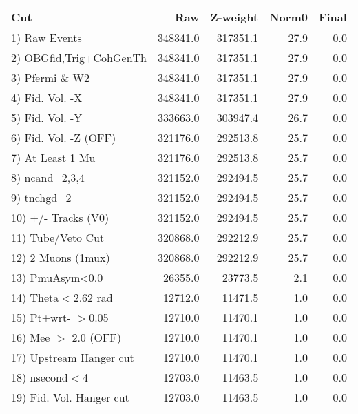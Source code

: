  \begin{table}[h!]\centering
 \begin{tabular}{||l||r|r|r|r||}
 \hline
 \hline
 Cut & Raw & Z-weight & Norm0 & Final \\
 \hline
  1) Raw Events           &    348341.0 &    317351.1 &        27.9 &         0.0 \\
  2) OBGfid,Trig+CohGenTh &    348341.0 &    317351.1 &        27.9 &         0.0 \\
  3) Pfermi \& W2         &    348341.0 &    317351.1 &        27.9 &         0.0 \\
  4) Fid. Vol. -X         &    348341.0 &    317351.1 &        27.9 &         0.0 \\
  5) Fid. Vol. -Y         &    333663.0 &    303947.4 &        26.7 &         0.0 \\
  6) Fid. Vol. -Z (OFF)   &    321176.0 &    292513.8 &        25.7 &         0.0 \\
  7) At Least 1 Mu        &    321176.0 &    292513.8 &        25.7 &         0.0 \\
  8) ncand=2,3,4          &    321152.0 &    292494.5 &        25.7 &         0.0 \\
  9) tnchgd=2             &    321152.0 &    292494.5 &        25.7 &         0.0 \\
 10) +/- Tracks (V0)      &    321152.0 &    292494.5 &        25.7 &         0.0 \\
 11) Tube/Veto Cut        &    320868.0 &    292212.9 &        25.7 &         0.0 \\
 12) 2 Muons (1mux)       &    320868.0 &    292212.9 &        25.7 &         0.0 \\
 13) PmuAsym<0.0          &     26355.0 &     23773.5 &         2.1 &         0.0 \\
 14) Theta$<$2.62 rad     &     12712.0 &     11471.5 &         1.0 &         0.0 \\
 15) Pt+wrt- $>$0.05      &     12710.0 &     11470.1 &         1.0 &         0.0 \\
 16) Mee $>$ 2.0  (OFF)   &     12710.0 &     11470.1 &         1.0 &         0.0 \\
 17) Upstream Hanger cut  &     12710.0 &     11470.1 &         1.0 &         0.0 \\
 18) nsecond$<$4          &     12703.0 &     11463.5 &         1.0 &         0.0 \\
 19) Fid. Vol. Hanger cut &     12703.0 &     11463.5 &         1.0 &         0.0 \\

\end{tabular}
\end{table}
